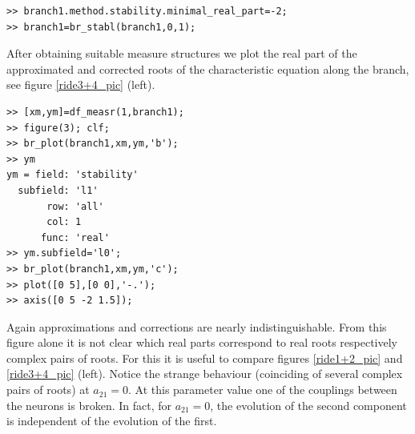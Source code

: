 \documentclass[10pt]{article}
\begin{document}
{{\small\begin{verbatim}
>> branch1.method.stability.minimal_real_part=-2;
>> branch1=br_stabl(branch1,0,1);
\end{verbatim}}
After obtaining suitable measure structures
we plot the real part of the approximated and corrected 
roots of the
characteristic equation along the branch, see figure
\ref{ride3+4_pic} (left). 
{\small\begin{verbatim}
>> [xm,ym]=df_measr(1,branch1);
>> figure(3); clf;
>> br_plot(branch1,xm,ym,'b');
>> ym
ym = field: 'stability'
  subfield: 'l1'
       row: 'all'
       col: 1
      func: 'real'
>> ym.subfield='l0';
>> br_plot(branch1,xm,ym,'c');
>> plot([0 5],[0 0],'-.');
>> axis([0 5 -2 1.5]);
\end{verbatim}}
Again approximations and 
corrections are nearly indistinguishable. From this figure alone it
is not clear which real parts correspond to real roots respectively
complex pairs of roots. For this it is 
useful to compare figures \ref{ride1+2_pic} and \ref{ride3+4_pic} (left).
Notice the strange behaviour (coinciding of several complex pairs
of roots) at $a_{21}=0$. At this parameter value
one of the couplings between the neurons is broken.
In fact, for $a_{21}=0$, the evolution of the second component is independent of
the evolution of the first. 
\begin{figure}[h]
\begin{center}

\end{center}
\end{figure}}
\end{document}
